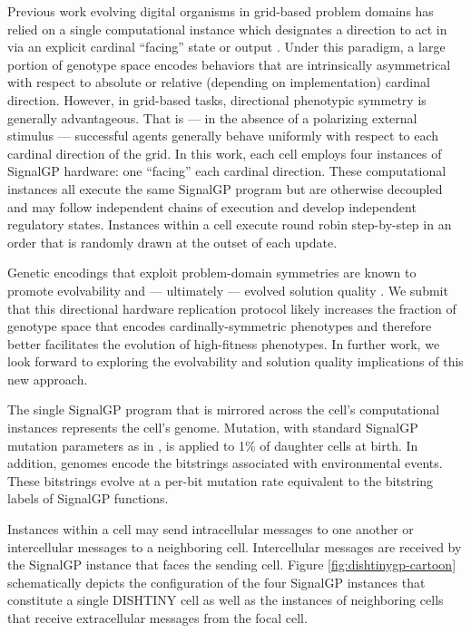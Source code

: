 Previous work evolving digital organisms in grid-based problem domains has relied on a single computational instance which designates a direction to act in via an explicit cardinal ``facing'' state or output .
Under this paradigm, a large portion of genotype space encodes behaviors that are intrinsically asymmetrical with respect to absolute or relative (depending on implementation) cardinal direction.
However, in grid-based tasks, directional phenotypic symmetry is generally advantageous.
That is --- in the absence of a polarizing external stimulus --- successful agents generally behave uniformly with respect to each cardinal direction of the grid.
In this work, each cell employs four instances of SignalGP hardware: one ``facing'' each cardinal direction.
These computational instances all execute the same SignalGP program but are otherwise decoupled and may follow independent chains of execution and develop independent regulatory states.
Instances within a cell execute round robin step-by-step in an order that is randomly drawn at the outset of each update.

Genetic encodings that exploit problem-domain symmetries are known to promote evolvability and --- ultimately --- evolved solution quality .
We submit that this directional hardware replication protocol likely increases the fraction of genotype space that encodes cardinally-symmetric phenotypes and therefore better facilitates the evolution of high-fitness phenotypes.
In further work, we look forward to exploring the evolvability and solution quality implications of this new approach.

The single SignalGP program that is mirrored across the cell's computational instances represents the cell's genome.
Mutation, with standard SignalGP mutation parameters as in , is applied to 1\% of daughter cells at birth.
In addition, genomes encode the bitstrings associated with environmental events.
These bitstrings evolve at a per-bit mutation rate equivalent to the bitstring labels of SignalGP functions.

Instances within a cell may send intracellular messages to one another or intercellular messages to a neighboring cell.
Intercellular messages are received by the SignalGP instance that faces the sending cell.
Figure \ref{fig:dishtinygp-cartoon} schematically depicts the configuration of the four SignalGP instances that constitute a single DISHTINY cell as well as the instances of neighboring cells that receive extracellular messages from the focal cell.


